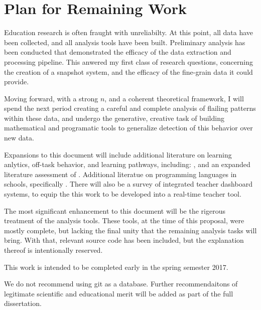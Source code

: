 \chapter{Plan for Remaining Work} %

Education research is often fraught with unreliabilty. At this point, all data have been collected, and all analysis tools have been built. Preliminary analysis has been conducted that demonstrated the efficacy of the data extraction and processing pipeline. This anwered my first class of research questions, concerning the creation of a snapshot system, and the efficacy of the fine-grain data it could provide. 

Moving forward, with a strong $n$, and a coherent theoretical framework, I will spend the next period creating a careful and complete analysis of flailing patterns within these data, and undergo the generative, creative task of building mathematical and programatic tools to generalize detection of this behavior over new data. 

Expansions to this document will include additional literature on learning anlytics, off-task behavior, and learning pathways, including: \cite{martin2013nanogenetic}, \cite{baker2004off} and an expanded literature assessment of \citet{berland-2013}. Additional literatue on programming languages in schools, specifically \cite{saez2016visual}. There will also be a survey of integrated teacher dashboard systems, to equip the this work to be developed into a real-time teacher tool. 

The most significant enhancement to this document will be the rigerous treatment of the analysis tools. These tools, at the time of this proposal, were mostly complete, but lacking the final unity that the remaining analysis tasks will bring. With that, relevant source code has been included, but the explanation thereof is intentionally reserved. 

This work is intended to be completed early in the spring semester 2017.
	


\label{sec:recommendations}
We do not recommend using git as a database. Further recommendaitons of legitimate scientific and educational merit will be added as part of the full dissertation.


